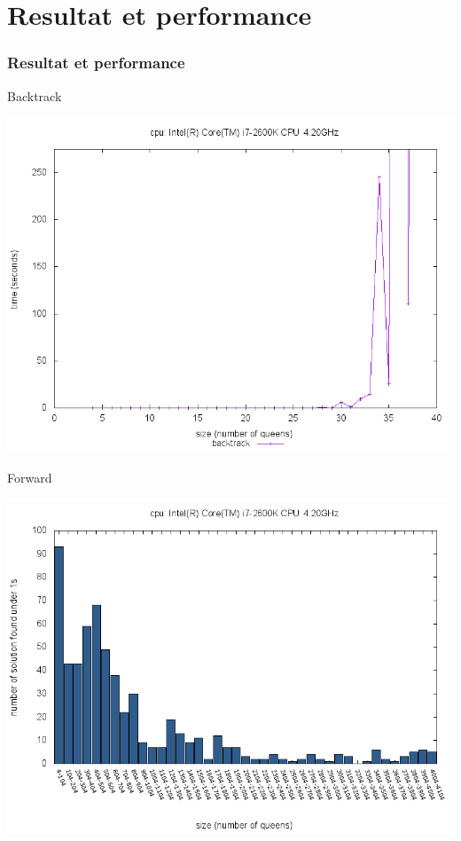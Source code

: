 \documentclass[10pt,a4paper]{beamer}
\begin{document}
\section{Resultat et performance}
\begin{frame}
	\frametitle{Resultat et performance}

	\begin{block}{Backtrack}

	\includegraphics[width=1\textwidth]{images/plot_bt_i7.png}

	\end{block}

	\begin{block}{Forward}

	\includegraphics[width=1\textwidth]{images/plot_fw_i7.png}


\end{block}
\end{frame}
\end{document}
